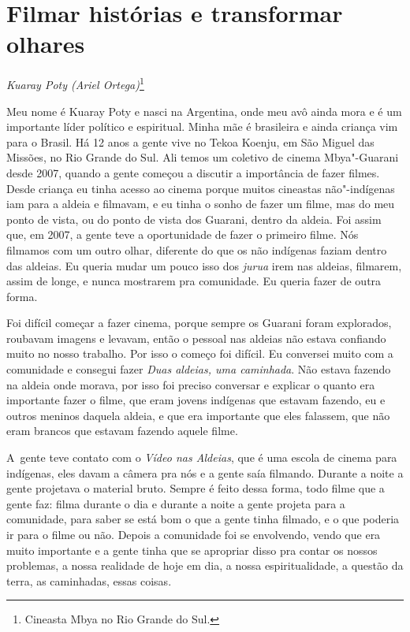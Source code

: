  


\chapter{Filmar histórias e transformar olhares}
\@openrighttrue\makeatother
\begin{flushright}
\emph{Kuaray Poty (Ariel Ortega)}\footnote{Cineasta Mbya no Rio Grande do
Sul.}
\end{flushright}
\medskip

\noindent Meu nome é Kuaray Poty e nasci na Argentina, onde meu avô ainda mora e é
um importante líder político e espiritual. Minha mãe é brasileira e
ainda criança vim para o Brasil. Há 12 anos a gente vive no Tekoa
Koenju, em São Miguel das Missões, no Rio Grande do Sul. Ali temos um
coletivo de cinema Mbya"-Guarani desde 2007, quando a gente começou a
discutir a importância de fazer filmes. Desde criança eu tinha acesso
ao cinema porque muitos cineastas não"-indígenas iam para a aldeia e
filmavam, e eu tinha o sonho de fazer um filme, mas do meu ponto de
vista, ou do ponto de vista dos Guarani, dentro da aldeia. Foi assim
que, em 2007, a gente teve a oportunidade de fazer o primeiro filme.
Nós filmamos com um outro olhar, diferente do que os não indígenas
faziam dentro das aldeias. Eu queria mudar um pouco isso dos \emph{jurua} irem
nas aldeias, filmarem, assim de longe, e nunca mostrarem pra
comunidade. Eu queria fazer de outra forma. 

Foi difícil começar a fazer cinema, porque sempre os Guarani foram
explorados, roubavam imagens e levavam, então o pessoal nas aldeias não
estava confiando muito no nosso trabalho. Por isso o começo foi
difícil. Eu conversei muito com a comunidade e consegui fazer \emph{Duas
aldeias, uma caminhada}. Não estava fazendo na aldeia onde morava, por
isso foi preciso conversar e explicar o quanto era importante fazer o
filme, que eram jovens indígenas que estavam fazendo, eu e outros
meninos daquela aldeia, e que era importante que eles falassem, que não
eram brancos que estavam fazendo aquele filme. 

A~gente teve contato com o \emph{Vídeo nas Aldeias}, que é uma escola de
cinema para indígenas, eles davam a câmera pra nós e a gente saía
filmando. Durante a noite a gente projetava o material bruto. Sempre é
feito dessa forma, todo filme que a gente faz: filma durante o dia e
durante a noite a gente projeta para a comunidade, para saber se está
bom o que a gente tinha filmado, e o que poderia ir para o filme ou não.
Depois a comunidade foi se envolvendo, vendo que era muito importante e
a gente tinha que se apropriar disso pra contar os nossos problemas, a
nossa realidade de hoje em dia, a nossa espiritualidade, a questão da
terra, as caminhadas, essas coisas.

